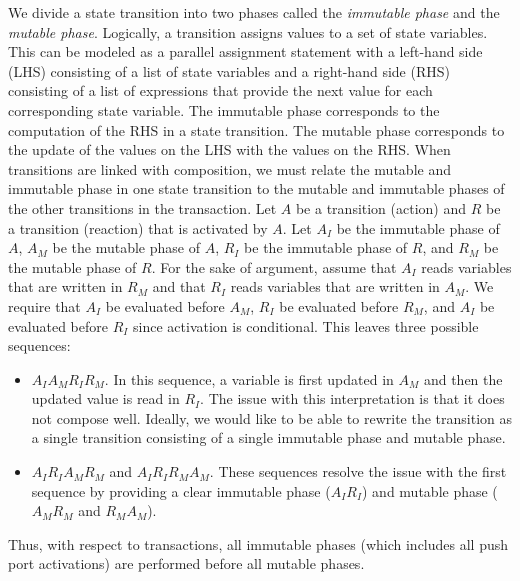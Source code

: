 We divide a state transition into two phases called the \emph{immutable phase} and the \emph{mutable phase}.
Logically, a transition assigns values to a set of state variables.
This can be modeled as a parallel assignment statement with a left-hand side (LHS) consisting of a list of state variables and a right-hand side (RHS) consisting of a list of expressions that provide the next value for each corresponding state variable.
The immutable phase corresponds to the computation of the RHS in a state transition.
The mutable phase corresponds to the update of the values on the LHS with the values on the RHS.
When transitions are linked with composition, we must relate the mutable and immutable phase in one state transition to the mutable and immutable phases of the other transitions in the transaction.
Let $A$ be a transition (action) and $R$ be a transition (reaction) that is activated by $A$.
Let $A_I$ be the immutable phase of $A$, $A_M$ be the mutable phase of $A$, $R_I$ be the immutable phase of $R$, and $R_M$ be the mutable phase of $R$.
For the sake of argument, assume that $A_I$ reads variables that are written in $R_M$ and that $R_I$ reads variables that are written in $A_M$.
We require that $A_I$ be evaluated before $A_M$, $R_I$ be evaluated before $R_M$, and $A_I$ be evaluated before $R_I$ since activation is conditional.
This leaves three possible sequences:
\begin{itemize}
\item $A_I A_M R_I R_M$.  In this sequence, a variable is first updated in $A_M$ and then the updated value is read in $R_I$.  The issue with this interpretation is that it does not compose well.  Ideally, we would like to be able to rewrite the transition as a single transition consisting of a single immutable phase and mutable phase.
\item $A_I R_I A_M R_M$ and $A_I R_I R_M A_M$.  These sequences resolve the issue with the first sequence by providing a clear immutable phase ($A_I R_I$) and mutable phase ($A_M R_M$ and $R_M A_M$).
\end{itemize}
Thus, with respect to transactions, all immutable phases (which includes all push port activations) are performed before all mutable phases.

